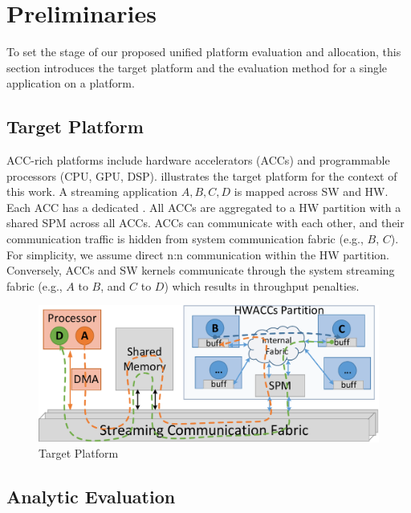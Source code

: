 \vspace{-2pt}
\section{Preliminaries}
\label{sec:pre}

To set the stage of our proposed unified platform evaluation and allocation, this section introduces the target platform and the evaluation method for a single application on a platform.


\subsection{Target Platform}

ACC-rich platforms include hardware accelerators (ACCs) and programmable processors (CPU, GPU, DSP).  illustrates the target platform for the context of this work. A streaming application $A, B, C, D$ is mapped across SW and HW. Each ACC has a dedicated . All ACCs are aggregated to a HW partition with a shared SPM across all ACCs. ACCs can communicate with each other, and their communication traffic is hidden from system communication fabric (e.g., $B$, $C$). For simplicity, we assume direct n:n communication within the HW partition. Conversely, ACCs and SW kernels communicate through the system streaming fabric (e.g., $A$ to $B$, and $C$ to $D$) which results in throughput penalties.

\vspace{-2pt}
\begin{figure}[h]
	\centering
	\includegraphics[width=.8\linewidth]{fig/pPlat.pdf}
	\vspace{-4pt}
	\caption{Target Platform}
	\label{fig:plat}
\end{figure}


\vspace{-4pt}
\subsection{Analytic Evaluation}
\label{subsec:ana}

